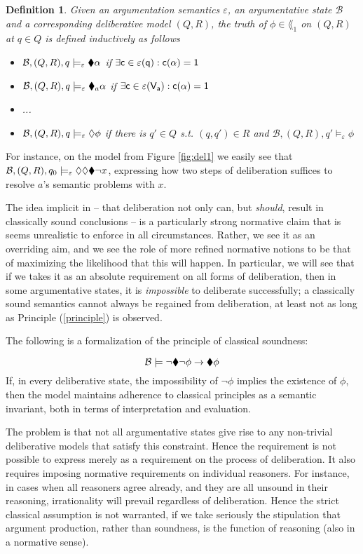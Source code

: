 \documentclass{article}
\newtheorem{definition}[thm]{Definition}
\newcommand{\clab}{\sf c}
\newcommand{\views}{\mathcal B}
\newcommand{\sem}{\varepsilon}
\begin{document}
\begin{definition}\label{truth1}
Given an argumentation semantics $\sem$, an argumentative state $\views$ and a corresponding deliberative model $(Q,R)$, the truth of $\phi \in \lang_1$ on $(Q,R)$ at $q \in Q$ is defined inductively as follows
\begin{itemize}
\item $\views, (Q,R),q\models_\sem \cdia \alpha$ if $\exists \clab \in \sem(q): \overline \clab(\alpha) = 1$
\item $\views,(Q,R),q\models_\sem \cdia_a \alpha$ if $\exists \clab \in \sem(V_a): \overline \clab(\alpha) = 1$
\item ...
\item $\views,(Q,R),q \models_\sem \adia \phi$ if there is $q' \in Q$ s.t. $(q,q') \in R$ and $\views,(Q,R),q' \models_\sem \phi$
\end{itemize}
\end{definition}
 
For instance, on the model from Figure \ref{fig:del1} we easily see that $\views, (Q,R), q_0 \models_\sem \adia \adia \cdia \neg x$, expressing how two steps of deliberation suffices to resolve $a$'s semantic problems with $x$.

The idea implicit in \cite{whyreason} -- that deliberation not only can, but \emph{should}, result in classically sound conclusions -- is a particularly strong normative claim that is seems unrealistic to enforce in all circumstances. Rather, we see it as an overriding aim, and we see the role of more refined normative notions to be that of maximizing the likelihood that this will happen. In particular, we will see that if we takes it as an absolute requirement on all forms of deliberation, then in some argumentative states, it is \emph{impossible} to deliberate successfully; a classically sound semantics cannot always be regained from deliberation, at least not as long as Principle (\ref{principle}) is observed.

The following is a formalization of the principle of classical soundness:

$$
\views \models \neg \cdia \neg \phi \to \cdia \phi
$$
If, in every deliberative state, the impossibility of $\neg \phi$ implies the existence of $\phi$, then the model maintains adherence to classical principles as a semantic invariant, both in terms of interpretation and evaluation.

The problem is that not all argumentative states give rise to any non-trivial deliberative models that satisfy this constraint. Hence the requirement is not possible to express merely as a requirement on the process of deliberation. It also requires imposing normative requirements on individual reasoners. For instance, in cases when all reasoners agree already, and they are all unsound in their reasoning, irrationality will prevail regardless of deliberation. Hence the strict classical assumption is not warranted, if we take seriously the stipulation that argument production, rather than soundness, is the function of reasoning (also in a normative sense).
\end{document}
